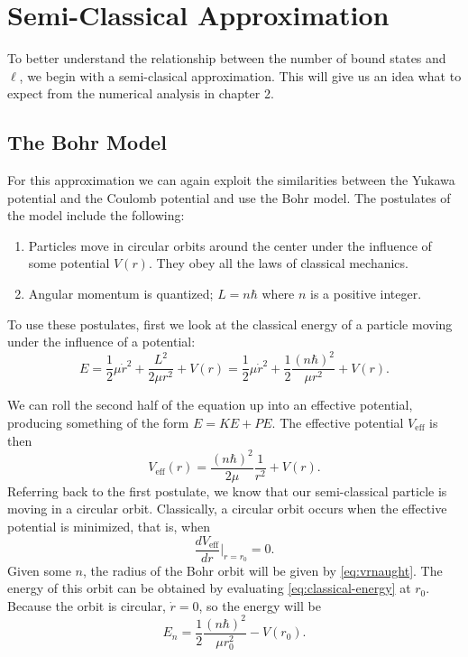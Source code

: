 \documentclass[12pt,twoside]{reedthesis}
\newcommand{\eqn}[1]{\begin{equation}#1\end{equation}}
\begin{document}
\clearpage %

\chapter{Semi-Classical Approximation}
To better understand the relationship between the number of bound states and $\ell$, we begin with a semi-clasical approximation. This will give us an idea what to expect from the numerical analysis in chapter 2.
\section{The Bohr Model}
For this approximation we can again exploit the similarities between the Yukawa potential and the Coulomb potential and use the Bohr model. 
The postulates of the model include the following:
\begin{enumerate}
\item Particles move in circular orbits around the center under the influence of some potential $V(r)$. They obey all the laws of classical mechanics.
\item Angular momentum is quantized; $L = n\hbar$ where $n$ is a positive integer.
\end{enumerate}

To use these postulates, first we look at the classical energy of a particle moving under the influence of a potential:
\eqn{
E = \frac{1}{2} \mu \dot{r}^2 + \frac{L^2}{2 \mu r^2} + V(r) = \frac{1}{2}\mu \dot{r}^2+\frac{1}{2}\frac{(n \hbar)^2}{\mu r^2}+V(r)\mbox{.}
\label{eq:classical-energy}
}

We can roll the second half of the equation up into an effective potential, producing something of the form $E = KE + PE$. The effective potential $V_{\mathrm{eff}}$ is then
\eqn{
V_{\mathrm{eff}}(r)=\frac{(n \hbar)^2}{2 \mu}\frac{1}{r^2}+V(r)\mbox{.}
\label{eq:veff}
}
Referring back to the first postulate, we know that our semi-classical particle is moving in a circular orbit. Classically, a circular orbit occurs when the effective potential is minimized, that is, when
\eqn{
\frac{dV_{\mathrm{eff}}}{d r}\Big |_{r = r_0}= 0\mbox{.}
\label{eq:vrnaught}
}
Given some $n$, the radius of the Bohr orbit will be given by \eqref{eq:vrnaught}. The energy of this orbit can be obtained by evaluating \eqref{eq:classical-energy}
 at $r_0$. Because the orbit is circular, $\dot{r} = 0$, so the energy will be 
\eqn{
E_{n} = \frac{1}{2}\frac{(n\hbar)^2}{\mu r_0^2} - V(r_0)\mbox{.}
}
\end{document}
